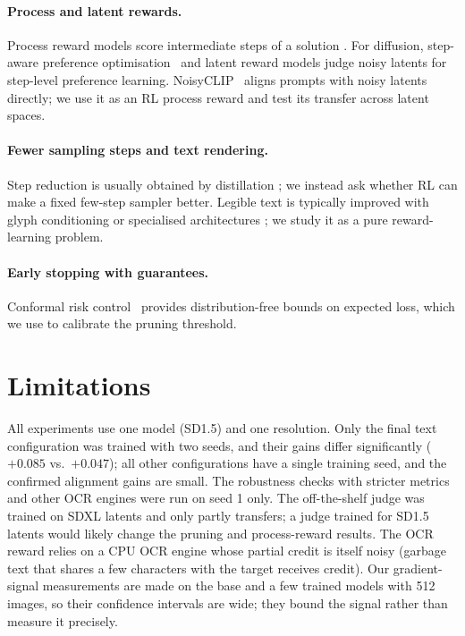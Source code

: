 \documentclass{article}
\begin{document}
\paragraph{Process and latent rewards.} Process reward models score intermediate steps of a solution
\citep{lightman2023verify}. For diffusion, step-aware preference optimisation~\citep{liang2024spo} and latent reward models
\citep{zhang2025lpo} judge noisy latents for step-level preference learning. NoisyCLIP~\citep{ramos2026noisyclip} aligns prompts
with noisy latents directly; we use it as an RL process reward and test its transfer across latent spaces.

\paragraph{Fewer sampling steps and text rendering.} Step reduction is usually obtained by distillation
\citep{salimans2022progressive,song2023consistency,luo2023lcm}; we instead ask whether RL can make a fixed few-step sampler
better. Legible text is typically improved with glyph conditioning or specialised architectures
\citep{chen2023textdiffuser,yang2023glyphcontrol}; we study it as a pure reward-learning problem.

\paragraph{Early stopping with guarantees.} Conformal risk control~\citep{angelopoulos2024crc} provides distribution-free
bounds on expected loss, which we use to calibrate the pruning threshold.

\section{Limitations}
\label{sec:limits}
All experiments use one model (SD1.5) and one resolution. Only the final text configuration was trained with two seeds, and
their gains differ significantly ($+0.085$ vs.\ $+0.047$); all other configurations have a single training seed, and the
confirmed alignment gains are small. The robustness checks with stricter metrics and other OCR engines were run on seed 1 only. The off-the-shelf judge was trained on SDXL latents and only partly transfers; a judge trained for SD1.5
latents would likely change the pruning and process-reward results. The OCR reward relies on a CPU OCR engine whose partial
credit is itself noisy (garbage text that shares a few characters with the target receives credit). Our gradient-signal
measurements are made on the base and a few trained models with 512 images, so their confidence intervals are wide; they bound
the signal rather than measure it precisely.
\end{document}

